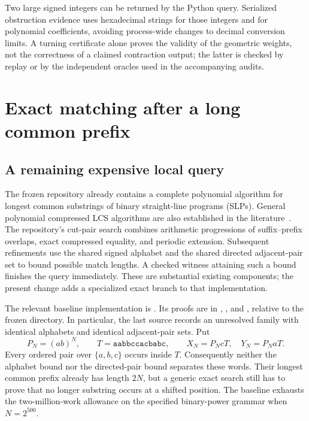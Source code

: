 \documentclass[11pt]{article}
\theoremstyle{definition}
\theoremstyle{remark}
\begin{document}
Two large signed integers can be returned by the Python query. Serialized
obstruction evidence uses hexadecimal strings for those integers and for
polynomial coefficients, avoiding process-wide changes to decimal
conversion limits. A turning certificate alone proves the validity of
the geometric weights, not the correctness of a claimed contraction
output; the latter is checked by replay or by the independent oracles
used in the accompanying audits.

\section{Exact matching after a long common prefix}
\label{sec:matching}

\subsection{A remaining expensive local query}

The frozen repository already contains a complete polynomial algorithm for
longest common substrings of binary straight-line programs (SLPs). General
polynomial compressed LCS algorithms are also established in the
literature~\cite{compressed-lcs-classical}. The repository's
cut-pair search combines arithmetic progressions of suffix--prefix overlaps,
exact compressed equality, and periodic extension. Subsequent refinements
use the shared signed alphabet and the shared directed adjacent-pair set
to bound possible match lengths. A checked witness attaining such a bound
finishes the query immediately. These are substantial existing components;
the present change adds a specialized exact branch to that implementation.

The relevant baseline implementation is
. Its proofs are in
, ,
and , relative to the frozen
 directory. In particular, the last source
records an unresolved family with identical alphabets and identical
adjacent-pair sets. Put
\[
 P_N=(ab)^N,\qquad T=\mathtt{aabbccacbabc},\qquad
 X_N=P_NcT,\quad Y_N=P_NaT.
\]
Every ordered pair over $\{a,b,c\}$ occurs inside $T$. Consequently neither
the alphabet bound nor the directed-pair bound separates these words.
Their longest common prefix already has length $2N$, but a generic exact
search still has to prove that no longer substring occurs at a shifted
position. The baseline exhausts the two-million-work allowance on the
specified binary-power grammar when $N=2^{500}$.
\end{document}
